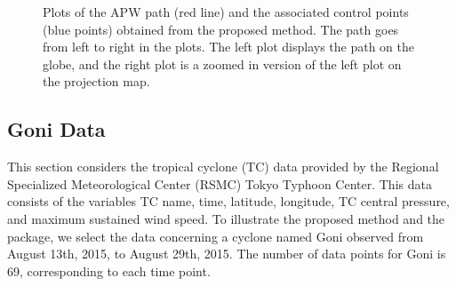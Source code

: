 \begin{figure}

{\centering {}

}

\caption{Plots of the APW path (red line) and the associated control points (blue points) obtained from the proposed method. The path goes from left to right in the plots. The left plot displays the path on the globe, and the right plot is a zoomed in version of the left plot on the projection map.}\label{fig:APW}
\end{figure}

\subsection*{Goni Data}\label{goni-data}

This section considers the tropical cyclone (TC) data provided by the Regional Specialized Meteorological Center (RSMC) Tokyo Typhoon Center. This data consists of the variables TC name, time, latitude, longitude, TC central pressure, and maximum sustained wind speed. To illustrate the proposed method and the  package, we select the data concerning a cyclone named Goni observed from August 13th, 2015, to August 29th, 2015. The number of data points for Goni is 69, corresponding to each time point.


